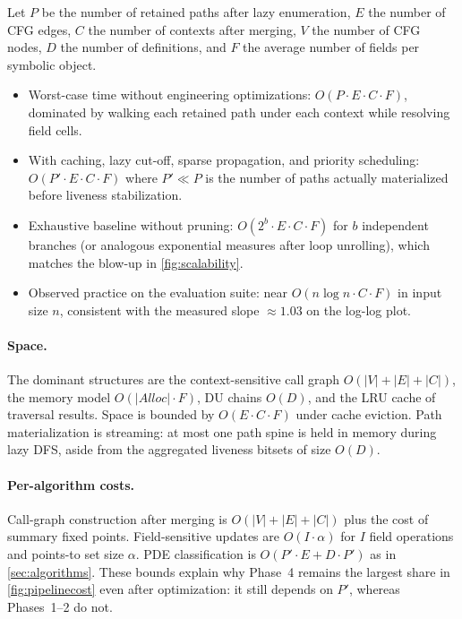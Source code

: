 \documentclass[acmsmall,screen,review,anonymous]{acmart}
\begin{document}
Let $P$ be the number of retained paths after lazy enumeration, $E$ the number of CFG edges, $C$ the number of contexts after merging, $V$ the number of CFG nodes, $D$ the number of definitions, and $F$ the average number of fields per symbolic object.

\begin{itemize}[leftmargin=*,itemsep=1pt]
\item Worst-case time without engineering optimizations: $O(P\cdot E\cdot C\cdot F)$, dominated by walking each retained path under each context while resolving field cells.
\item With caching, lazy cut-off, sparse propagation, and priority scheduling: $O(P'\cdot E\cdot C\cdot F)$ where $P'\ll P$ is the number of paths actually materialized before liveness stabilization.
\item Exhaustive baseline without pruning: $O(2^{b}\cdot E\cdot C\cdot F)$ for $b$ independent branches (or analogous exponential measures after loop unrolling), which matches the blow-up in \autoref{fig:scalability}.
\item Observed practice on the evaluation suite: near $O(n\log n\cdot C\cdot F)$ in input size $n$, consistent with the measured slope $\approx 1.03$ on the log-log plot.
\end{itemize}

\paragraph{Space.}
The dominant structures are the context-sensitive call graph $O(|V|+|E|+|C|)$, the memory model $O(|\mathit{Alloc}|\cdot F)$, DU chains $O(D)$, and the LRU cache of traversal results. Space is bounded by $O(E\cdot C\cdot F)$ under cache eviction. Path materialization is streaming: at most one path spine is held in memory during lazy DFS, aside from the aggregated liveness bitsets of size $O(D)$.

\paragraph{Per-algorithm costs.}
Call-graph construction after merging is $O(|V|+|E|+|C|)$ plus the cost of summary fixed points. Field-sensitive updates are $O(I\cdot\alpha)$ for $I$ field operations and points-to set size $\alpha$. PDE classification is $O(P'\cdot E+D\cdot P')$ as in \autoref{sec:algorithms}. These bounds explain why Phase~4 remains the largest share in \autoref{fig:pipelinecost} even after optimization: it still depends on $P'$, whereas Phases~1--2 do not.
\end{document}
